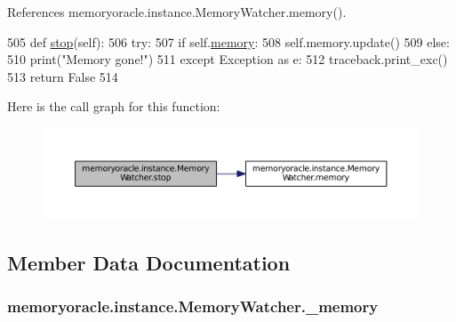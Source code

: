 References memoryoracle.\+instance.\+Memory\+Watcher.\+memory().


\begin{DoxyCode}
505     \textcolor{keyword}{def }\hyperlink{classmemoryoracle_1_1instance_1_1MemoryWatcher_a8bf3cc01cab2a9b1bf981f6f53546cb6}{stop}(self):
506         \textcolor{keywordflow}{try}:
507             \textcolor{keywordflow}{if} self.\hyperlink{classmemoryoracle_1_1instance_1_1MemoryWatcher_a81f9df7e7ef5e31d793ae395594e4bd9}{memory}:
508                 self.memory.update()
509             \textcolor{keywordflow}{else}:
510                 print(\textcolor{stringliteral}{"Memory gone!"})
511         \textcolor{keywordflow}{except} Exception \textcolor{keyword}{as} e:
512             traceback.print\_exc()
513         \textcolor{keywordflow}{return} \textcolor{keyword}{False}
514 
\end{DoxyCode}


Here is the call graph for this function\+:
\nopagebreak
\begin{figure}[H]
\begin{center}
\leavevmode
\includegraphics[width=350pt]{classmemoryoracle_1_1instance_1_1MemoryWatcher_a8bf3cc01cab2a9b1bf981f6f53546cb6_cgraph}
\end{center}
\end{figure}




\subsection{Member Data Documentation}
\hypertarget{classmemoryoracle_1_1instance_1_1MemoryWatcher_a7148f567970cd13c427af77c66351323}{}
\subsubsection[{\+\_\+memory}]{\setlength{\rightskip}{0pt plus 5cm}memoryoracle.\+instance.\+Memory\+Watcher.\+\_\+memory\hspace{0.3cm}{\ttfamily [private]}}\label{classmemoryoracle_1_1instance_1_1MemoryWatcher_a7148f567970cd13c427af77c66351323}


